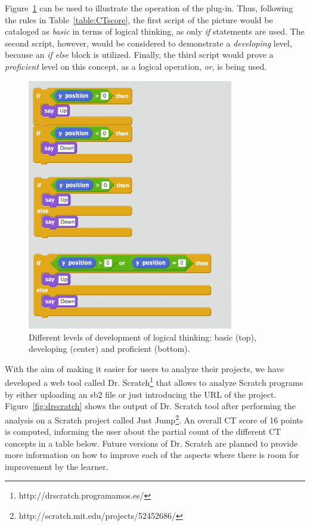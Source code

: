 \documentclass[a4paper,11pt]{article}
\begin{document}
Figure~\ref{fig:logic} can be used to illustrate the operation of the plug-in. Thus, following the rules in Table~\ref{table:CTscore}, the first script of the picture would be cataloged as \textit{basic} in terms of logical thinking, as only \textit{if} statements are used. The second script, however, would be considered to demonstrate a \textit{developing} level, because an \textit{if else} block is utilized. Finally, the third script would prove a \textit{proficient} level on this concept, as a logical operation, \textit{or}, is being used.

\begin{figure}
  \centering
    \includegraphics[width=9cm]{img/Logic.png}
    \caption{Different levels of development of logical thinking: basic (top), developing (center) and proficient (bottom).}
    \label{fig:logic}
\end{figure}

With the aim of making it easier for users to analyze their projects, we have developed a web tool called Dr. Scratch\footnote{http://drscratch.programamos.es/} that allows to analyze Scratch programs by either uploading an sb2 file or just introducing the URL of the project. Figure~\ref{fig:drscratch} shows the output of Dr. Scratch tool after performing the analysis on a Scratch project called Just Jump\footnote{http://scratch.mit.edu/projects/52452686/}. An overall CT score of 16 points is computed, informing the user about the partial count of the different CT concepts in a table below. Future versions of Dr. Scratch are planned to provide more information on how to improve each of the aspects where there is room for improvement by the learner.
\end{document}

